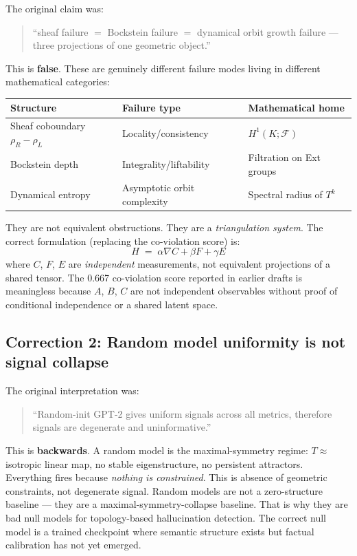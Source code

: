 \documentclass[11pt,a4paper]{article}
\begin{document}
The original claim was:
\begin{quote}
``sheaf failure $=$ Bockstein failure $=$ dynamical orbit growth failure ---
three projections of one geometric object.''
\end{quote}
This is \textbf{false}. These are genuinely different failure modes
living in different mathematical categories:
\begin{center}
\renewcommand{\arraystretch}{1.3}\small
\begin{tabular}{lll}
\toprule
Structure & Failure type & Mathematical home \\
\midrule
Sheaf coboundary $\rho_R - \rho_L$ & Locality/consistency & $H^1(K; \mathcal{F})$ \\
Bockstein depth & Integrality/liftability & Filtration on Ext groups \\
Dynamical entropy & Asymptotic orbit complexity & Spectral radius of $T^k$ \\
\bottomrule
\end{tabular}
\end{center}
They are not equivalent obstructions. They are a \emph{triangulation system}.
The correct formulation (replacing the co-violation score) is:
\[
  H \;=\; \alpha \nabla C + \beta F + \gamma E
\]
where $C$, $F$, $E$ are \emph{independent} measurements, not equivalent
projections of a shared tensor.
The 0.667 co-violation score reported in earlier drafts is meaningless
because $A$, $B$, $C$ are not independent observables
without proof of conditional independence or a shared latent space.

\subsection*{Correction 2: Random model uniformity is not signal collapse}

The original interpretation was:
\begin{quote}
``Random-init GPT-2 gives uniform signals across all metrics,
therefore signals are degenerate and uninformative.''
\end{quote}
This is \textbf{backwards}. A random model is the maximal-symmetry regime:
$T \approx$ isotropic linear map, no stable eigenstructure, no persistent attractors.
Everything fires because \emph{nothing is constrained}.
This is absence of geometric constraints, not degenerate signal.
Random models are not a zero-structure baseline --- they are a
maximal-symmetry-collapse baseline.
That is why they are bad null models for topology-based hallucination detection.
The correct null model is a trained checkpoint where semantic structure
exists but factual calibration has not yet emerged.
\end{document}
